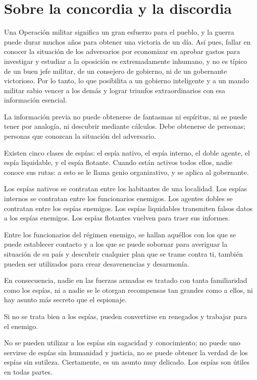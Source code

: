 \chapter{Sobre la concordia y la discordia}

Una Operación militar significa un gran esfuerzo para el pueblo, y la guerra puede durar muchos años para obtener una victoria de un día. Así pues, fallar en conocer la situación de los adversarios por economizar en aprobar gastos para investigar y estudiar a la oposición es extremadamente inhumano, y no es típico de un buen jefe militar, de un consejero de gobierno, ni de un gobernante victorioso. Por lo tanto, lo que posibilita a un gobierno inteligente y a un mando militar sabio vencer a los demás y lograr triunfos extraordinarios con esa información esencial.

La información previa no puede obtenerse de fantasmas ni espíritus, ni se puede tener por analogía, ni descubrir mediante cálculos. Debe obtenerse de personas; personas que conozcan la situación del adversario.

Existen cinco clases de espías: el espía nativo, el espía interno, el doble agente, el espía liquidable, y el espía flotante. Cuando están activos todos ellos, nadie conoce sus rutas: a esto se le llama genio organizativo, y se aplica al gobernante.

Los espías nativos se contratan entre los habitantes de una localidad. Los espías internos se contratan entre los funcionarios enemigos. Los agentes dobles se contratan entre los espías enemigos. Los espías liquidables transmiten falsos datos a los espías enemigos. Los espías flotantes vuelven para traer sus informes.

Entre los funcionarios del régimen enemigo, se hallan aquéllos con los que se puede establecer contacto y a los que se puede sobornar para averiguar la situación de su país y descubrir cualquier plan que se trame contra ti, también pueden ser utilizados para crear desavenencias y desarmonía.

En consecuencia, nadie en las fuerzas armadas es tratado con tanta familiaridad como los espías, ni a nadie se le otorgan recompensas tan grandes como a ellos, ni hay asunto más secreto que el espionaje.

Si no se trata bien a los espías, pueden convertirse en renegados y trabajar para el enemigo.

No se pueden utilizar a los espías sin sagacidad y conocimiento; no puede uno servirse de espías sin humanidad y justicia, no se puede obtener la verdad de los espías sin sutileza. Ciertamente, es un asunto muy delicado. Los espías son útiles en todas partes.

